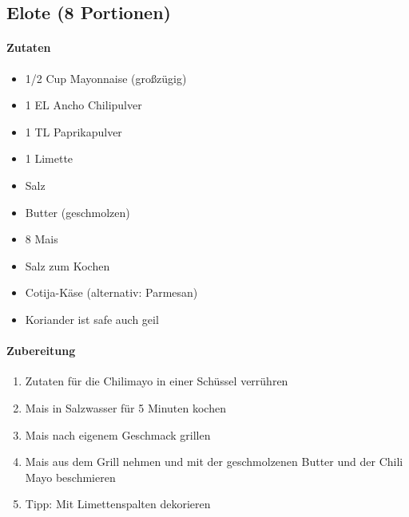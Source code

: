 \newpage
\subsection{Elote (8 Portionen)}
\paragraph{Zutaten}
\begin{itemize}[noitemsep]
	\item 1/2 Cup Mayonnaise (großzügig)
	\item 1 EL Ancho Chilipulver
	\item 1 TL Paprikapulver
	\item 1 Limette
	\item Salz
	\vspace{0.5cm}
	\item Butter (geschmolzen)
	\item 8 Mais
	\item Salz zum Kochen
	\item Cotija-Käse (alternativ: Parmesan)
	\item Koriander ist safe auch geil
\end{itemize}

\paragraph{Zubereitung}
\begin{enumerate}[noitemsep]
	\item Zutaten für die Chilimayo in einer Schüssel verrühren
	\item Mais in Salzwasser für 5 Minuten kochen 
	\item Mais nach eigenem Geschmack grillen 
	\item Mais aus dem Grill nehmen und mit der geschmolzenen Butter und der Chili Mayo beschmieren 
	\item Tipp: Mit Limettenspalten dekorieren 
\end{enumerate}
